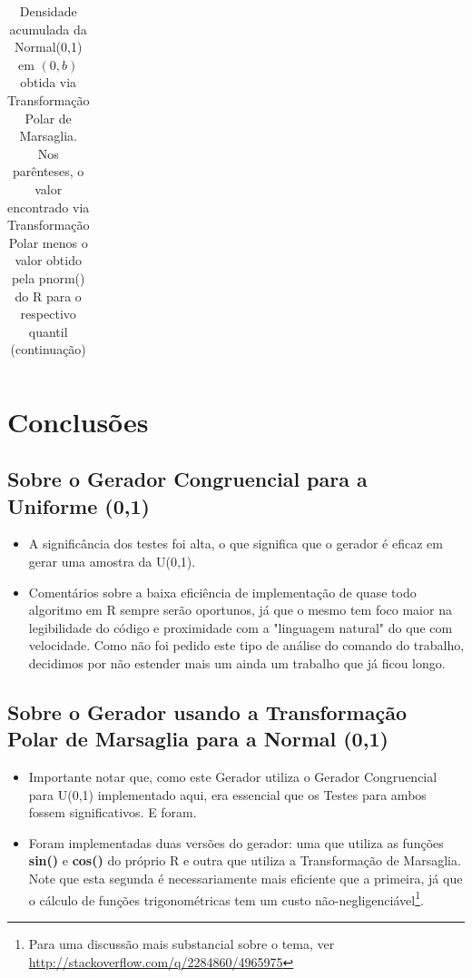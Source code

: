\documentclass[
	article,			%
	12pt,				%
	twoside,			%
	a4paper,			%
	english,			%
	brazil,				%
	]{abntex2}
\begin{document}
\begin{landscape}
\begin{table}
\begin{tabular}{c||p{18mm}|p{18mm}|p{18mm}|p{18mm}|p{18mm}|p{18mm}|p{18mm}|p{18mm}|p{18mm}|p{18mm}|p{18mm}|p{18mm}|p{18mm}|p{18mm}|p{18mm}|p{18mm}|p{18mm}}
\end{tabular}
\caption{Densidade acumulada da Normal(0,1) em $(0,b)$ obtida via Transformação Polar de Marsaglia. Nos parênteses, o valor encontrado via Transformação Polar menos o valor obtido pela pnorm() do R para o respectivo quantil (continuação)}

\end{table}
        	\end{landscape}
        	
\section{Conclusões}\label{cap:conclusoes}
\subsection{Sobre o Gerador Congruencial para a Uniforme (0,1)}
	\begin{itemize}
  \item A significância dos testes foi alta, o que significa que o gerador é eficaz em gerar uma amostra da U(0,1).
  \item Comentários sobre a baixa eficiência de implementação de quase todo algoritmo em R sempre serão oportunos, já que o mesmo tem foco maior na legibilidade do código e proximidade com a "linguagem natural" do que com velocidade. Como não foi pedido este tipo de análise do comando do trabalho, decidimos por não estender mais um ainda um trabalho que já ficou longo.
\end{itemize}

\subsection{Sobre o Gerador usando a Transformação Polar de Marsaglia para a Normal (0,1)}
  \begin{itemize}
  \item Importante notar que, como este Gerador utiliza o Gerador Congruencial para U(0,1) implementado aqui, era essencial que os Testes para ambos fossem significativos. E foram.
  \item Foram implementadas duas versões do gerador: uma que utiliza as funções \textbf{sin()} e \textbf{cos()} do próprio R e outra que utiliza a Transformação de Marsaglia. Note que esta segunda é necessariamente mais eficiente que a primeira, já que o cálculo de funções trigonométricas tem um custo não-negligenciável\footnote{Para uma discussão mais substancial sobre o tema, ver \url{http://stackoverflow.com/q/2284860/4965975}}.
\end{itemize}
\end{document}
